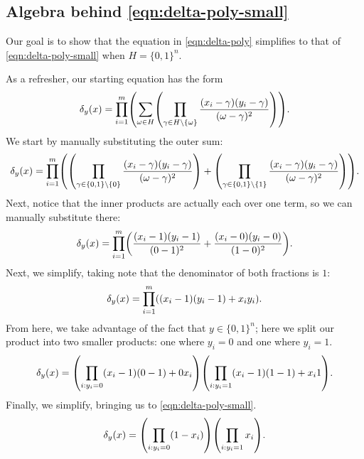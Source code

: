 \documentclass[english]{reedthesis}
\theoremstyle{plain}
\theoremstyle{definition}
\theoremstyle{remark}
\begin{document}
\begin{appendices}
\section{Algebra behind \cref{eqn:delta-poly-small}}\label{sec:delta-poly-small}

Our goal is to show that the equation in \cref{eqn:delta-poly} simplifies to
that of \cref{eqn:delta-poly-small} when $H = \{0, 1\}^{n}$.

As a refresher, our starting equation has the form
\begin{equation}
  \delta_{y}(x) = \prod_{i = 1}^{m}\mleft(\sum_{\omega \in H}\mleft(
  \prod_{\gamma \in H \setminus \{\omega\}}\frac{(x_{i} - \gamma)(y_{i} - \gamma)}{(\omega - \gamma)^{2}}
  \mright)\mright).
\end{equation}
We start by manually substituting the outer sum:
\begin{equation}
  \delta_{y}(x) = \prod_{i = 1}^{m}\mleft(\mleft(
    \prod_{\gamma \in \{0, 1\} \setminus \{0\}}\frac{(x_{i} - \gamma)(y_{i} - \gamma)}{(\omega - \gamma)^{2}}
    \mright) + \mleft(
    \prod_{\gamma \in \{0, 1\} \setminus \{1\}}\frac{(x_{i} - \gamma)(y_{i} - \gamma)}{(\omega - \gamma)^{2}}
    \mright)
  \mright).
\end{equation}
Next, notice that the inner products are actually each over one term, so we can
manually substitute there:
\begin{equation}
  \delta_{y}(x) = \prod_{i = 1}^{m}\mleft(
    \frac{(x_{i} - 1)(y_{i} - 1)}{(0 - 1)^{2}} +
    \frac{(x_{i} - 0)(y_{i} - 0)}{(1 - 0)^{2}}
  \mright).
\end{equation}
Next, we simplify, taking note that the denominator of both fractions is $1$:
\begin{equation}
  \delta_{y}(x) = \prod_{i = 1}^{m}\mleft((x_{i} - 1)(y_{i} - 1) + x_{i}y_{i}\mright).
\end{equation}
From here, we take advantage of the fact that $y \in \{0, 1\}^{n}$; here we split
our product into two smaller products: one where $y_{i} = 0$ and one where
$y_{i} = 1$.
\begin{equation}
  \delta_{y}(x) = \mleft(\prod_{i:y_{i}=0}(x_{i} - 1)(0 - 1) + 0x_{i}\mright)
  \mleft(\prod_{i:y_{i}=1}(x_{i} - 1)(1 - 1) + x_{i}1\mright).
\end{equation}
Finally, we simplify, bringing us to \cref{eqn:delta-poly-small}.
\begin{equation}
  \delta_{y}(x) = \mleft(\prod_{i:y_{i}=0}(1 - x_{i})\mright)\mleft(\prod_{i:y_{i}=1}x_{i}\mright).
\end{equation}


\end{appendices}
\end{document}
